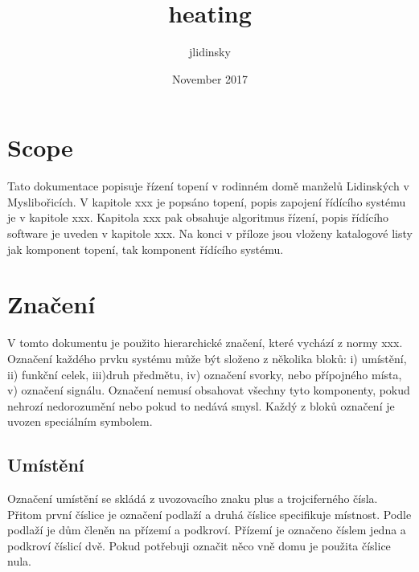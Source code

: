 \documentclass{book}
\title{heating}
\author{jlidinsky }
\date{November 2017}
\begin{document}
\maketitle

\chapter*{Scope}

    Tato dokumentace popisuje řízení topení v rodinném domě manželů Lidinských
    v Myslibořicích. V kapitole xxx je popsáno topení, popis zapojení řídícího
    systému je v kapitole xxx. Kapitola xxx pak obsahuje algoritmus řízení,
    popis řídícího software je uveden v kapitole xxx. Na konci v příloze jsou
    vloženy katalogové listy jak komponent topení, tak komponent řídícího
    systému.

\chapter{Značení}

    V tomto dokumentu je použito hierarchické značení, které vychází z normy
    xxx. Označení každého prvku systému může být složeno z několika bloků:
    i) umístění, ii) funkční celek, iii)druh předmětu, iv) označení svorky,
    nebo přípojného místa, v) označení signálu. Označení nemusí obsahovat
    všechny tyto komponenty, pokud nehrozí nedorozumění nebo pokud to nedává
    smysl. Každý z bloků označení je uvozen speciálním symbolem.

\section{Umístění}

    Označení umístění se skládá z uvozovacího znaku plus a trojciferného čísla.
    Přitom první číslice je označení podlaží a druhá číslice specifikuje
    místnost. Podle podlaží je dům členěn na přízemí a podkroví. Přízemí
    je označeno číslem jedna a podkroví číslicí dvě. Pokud potřebuji označit
    něco vně domu je použita číslice nula.
\end{document}
